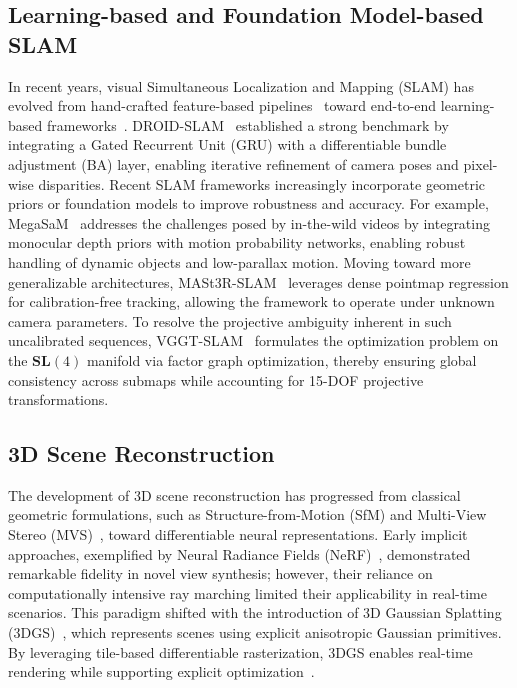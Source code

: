 \subsection{Learning-based and Foundation Model-based SLAM}
In recent years, visual Simultaneous Localization and Mapping (SLAM) has evolved from hand-crafted feature-based pipelines~\cite{campos2021orb,forster2014svo,engel2017direct} toward end-to-end learning-based frameworks~\cite{teed2021droid, teed2023deep}. DROID-SLAM~\cite{teed2021droid} established a strong benchmark by integrating a Gated Recurrent Unit (GRU) with a differentiable bundle adjustment (BA) layer, enabling iterative refinement of camera poses and pixel-wise disparities.
Recent SLAM frameworks increasingly incorporate geometric priors or foundation models to improve robustness and accuracy. For example, MegaSaM~\cite{li2025megasam} addresses the challenges posed by in-the-wild videos by integrating monocular depth priors with motion probability networks, enabling robust handling of dynamic objects and low-parallax motion. Moving toward more generalizable architectures, MASt3R-SLAM~\cite{murai2024_mast3rslam} leverages dense pointmap regression for calibration-free tracking, allowing the framework to operate under unknown camera parameters. To resolve the projective ambiguity inherent in such uncalibrated sequences, VGGT-SLAM~\cite{maggio2025vggt} formulates the optimization problem on the $\mathbf{SL}(4)$ manifold via factor graph optimization, thereby ensuring global consistency across submaps while accounting for 15-DOF projective transformations. %

\subsection{3D Scene Reconstruction}
The development of 3D scene reconstruction has progressed from classical geometric formulations, such as Structure-from-Motion (SfM) \cite{schonberger2016structure} and Multi-View Stereo (MVS)~\cite{schonberger2016pixelwise}, toward differentiable neural representations. Early implicit approaches, exemplified by Neural Radiance Fields (NeRF)~\cite{mildenhall2021nerf}, demonstrated remarkable fidelity in novel view synthesis; however, their reliance on computationally intensive ray marching limited their applicability in real-time scenarios. This paradigm shifted with the introduction of 3D Gaussian Splatting (3DGS)~\cite{kerbl20233d}, which represents scenes using explicit anisotropic Gaussian primitives. By leveraging tile-based differentiable rasterization, 3DGS enables real-time rendering while supporting explicit optimization~\cite{lu2024scaffold,jiang2025horizon,ren2024octree}.

